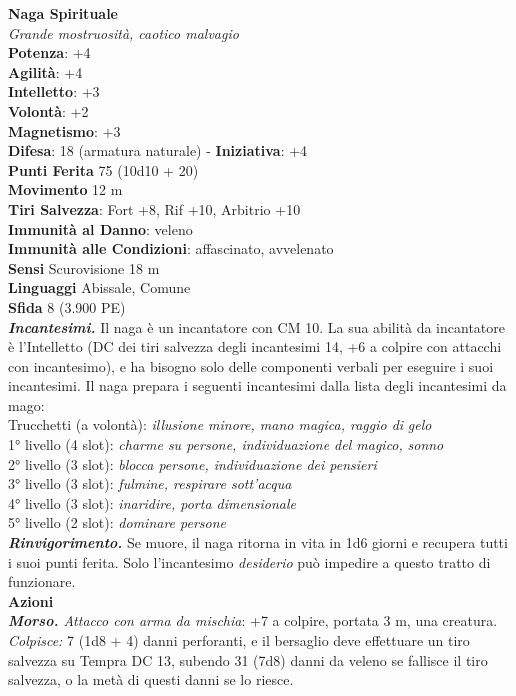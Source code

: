 \begin{multicols}{2}
\medskip\textbf{Naga Spirituale}\\
\emph{Grande mostruosità, caotico malvagio}\\
\textbf{Potenza}: +4\\
\textbf{Agilità}: +4\\
\textbf{Intelletto}: +3\\
\textbf{Volontà}: +2\\
\textbf{Magnetismo}: +3\\
\textbf{Difesa}: 18 (armatura naturale) - \textbf{Iniziativa}: +4\\
\textbf{Punti Ferita} 75 (10d10 + 20)\\
\textbf{Movimento} 12 m\\
\textbf{Tiri Salvezza}: Fort +8, Rif +10, Arbitrio +10\\
\textbf{Immunità al Danno}: veleno\\
\textbf{Immunità alle Condizioni}: affascinato, avvelenato\\
\textbf{Sensi} Scurovisione 18 m\\
\textbf{Linguaggi} Abissale, Comune\\
\textbf{Sfida} 8 (3.900 PE)\smallskip\\
\emph{\textbf{Incantesimi.}} Il naga è un incantatore con CM 10. La sua abilità da incantatore è l'Intelletto (DC dei tiri salvezza degli incantesimi 14, +6 a colpire con attacchi con incantesimo), e ha bisogno solo delle componenti verbali per eseguire i suoi incantesimi. Il naga prepara i seguenti incantesimi dalla lista degli incantesimi da mago: \\
Trucchetti (a volontà): \emph{illusione minore, mano magica, raggio di} \emph{gelo}\\
1° livello (4 slot): \emph{charme su persone, individuazione del magico,} \emph{sonno}\\
2° livello (3 slot): \emph{blocca persone, individuazione dei pensieri}\\
3° livello (3 slot): \emph{fulmine, respirare sott'acqua}\\
4° livello (3 slot): \emph{inaridire, porta dimensionale}\\
5° livello (2 slot): \emph{dominare persone}\\
\emph{\textbf{Rinvigorimento.}} Se muore, il naga ritorna in vita in 1d6 giorni e recupera tutti i suoi punti ferita. Solo l'incantesimo \emph{desiderio} può impedire a questo tratto di funzionare.\\
\smallskip\textbf{Azioni}\\
\emph{\textbf{Morso.} Attacco con arma da mischia}: +7 a colpire, portata 3 m, una creatura.\\
\emph{Colpisce:} 7 (1d8 + 4) danni perforanti, e il bersaglio deve effettuare un tiro salvezza su Tempra DC 13, subendo 31 (7d8) danni da veleno se fallisce il tiro salvezza, o la metà di questi danni se lo riesce.\\


\end{multicols}
